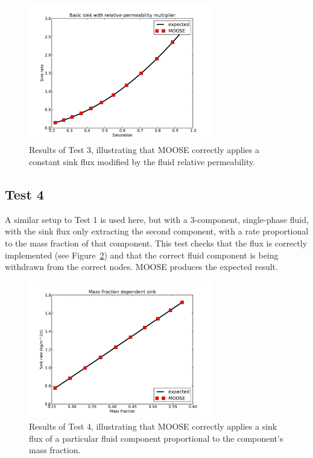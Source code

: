 \documentclass[]{scrreprt}
\begin{document}
\begin{figure}[htb]
\begin{center}
\includegraphics[width=8cm]{s03.pdf}
\caption{Results of Test 3, illustrating that MOOSE correctly applies
  a constant sink flux modified by the fluid relative permeability.}
\label{s03.fig}
\end{center}
\end{figure}


\subsection{Test 4}

A similar setup to Test 1 is used here, but with a 3-component,
single-phase fluid, with the sink flux only extracting the second
component, with a rate proportional to the mass fraction of that
component.  This test checks that the flux is correctly implemented
(see Figure~\ref{s07.fig}) and that the correct fluid component is being
withdrawn from the correct nodes.  MOOSE produces the expected result.

\begin{figure}[htb]
\begin{center}
\includegraphics[width=8cm]{s07.pdf}
\caption{Results of Test 4, illustrating that MOOSE correctly applies
  a sink flux of a particular fluid component proportional to the
  component's mass fraction.}
\label{s07.fig}
\end{center}
\end{figure}
\end{document}
